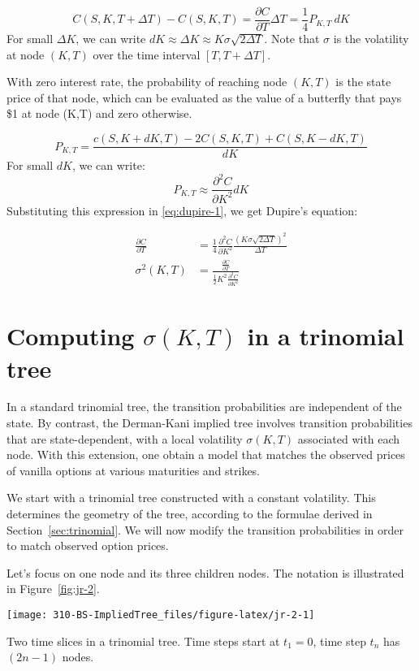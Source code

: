 \documentclass[]{tufte-book}
\begin{document}
\[
C(S,K,T+\Delta T) - C(S,K,T) = \frac{\partial C}{\partial T} \Delta T = \frac{1}{4} P_{K,T} \  dK
\]
For small \(\Delta K\), we can write \(dK \approx \Delta K \approx K \sigma \sqrt{2 \Delta T}\). Note that \(\sigma\) is the volatility at node \((K,T)\) over the time interval \([T, T+\Delta T]\).

With zero interest rate, the probability of reaching node \((K,T)\) is the state price of that node, which can be evaluated as the value of a butterfly that pays \$1 at node (K,T) and zero otherwise.

\[
P_{K,T} = \frac{c(S,K+dK,T)-2C(S,K,T)+C(S,K-dK,T)}{dK}
\]
For small \(dK\), we can write:
\[
P_{K,T} \approx \frac{\partial^2 C}{\partial K^2} dK
\]
Substituting this expression in \eqref{eq:dupire-1}, we get Dupire's equation:

\begin{align}
\frac{\partial C}{\partial T} &= \frac{1}{4} \frac{\partial^2 C}{\partial K^2} \frac{(K\sigma\sqrt{2 \Delta T})^2}{\Delta T} \\
\sigma^2(K,T) &= \frac{\frac{\partial C}{\partial T}}{\frac{1}{2} K^2 \frac{\partial^2 C}{\partial K^2}}
\end{align}

\hypertarget{computing-sigmakt-in-a-trinomial-tree}{%
\section{\texorpdfstring{Computing \(\sigma(K,T)\) in a trinomial tree}{Computing \textbackslash sigma(K,T) in a trinomial tree}}\label{computing-sigmakt-in-a-trinomial-tree}}

In a standard trinomial tree, the transition probabilities are
independent of the state. By contrast, the Derman-Kani implied tree
involves transition probabilities that are state-dependent, with a local volatility \(\sigma(K,T)\) associated with each node. With this
extension, one obtain a model that matches the observed prices of
vanilla options at various maturities and strikes.

We start with a trinomial tree constructed with a constant volatility.
This determines the geometry of the tree, according to the formulae
derived in Section~\ref{sec:trinomial}. We will now modify the transition
probabilities in order to match observed option prices.

Let's focus on one node and its three children nodes. The notation is
illustrated in Figure~\ref{fig:jr-2}.

\begin{marginfigure}
\texttt{[image: 310-BS-ImpliedTree\_files/figure-latex/jr-2-1]} \caption[Two time slices in a trinomial tree]{Two time slices in a trinomial tree. Time steps start at $t_1=0$, time step $t_n$ has $(2n-1)$ nodes.}\label{fig:jr-2}
\end{marginfigure}
\end{document}
